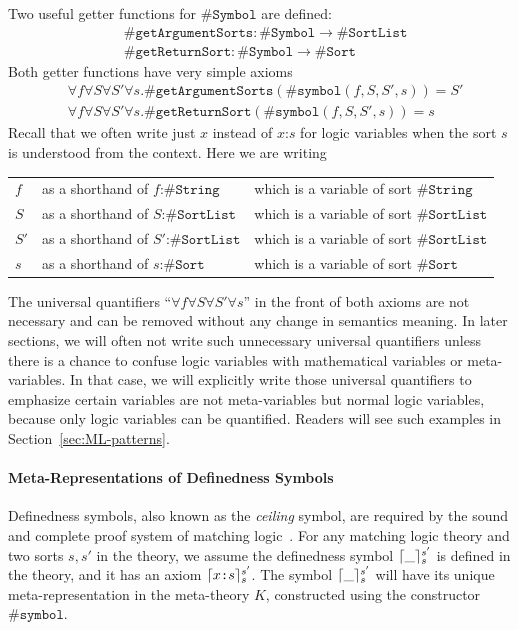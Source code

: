 \documentclass[UTF8,11pt]{article}
\theoremstyle{plain}
\theoremstyle{definition}
\theoremstyle{remark}
\DeclarePairedDelimiter{\ceil}{\lceil}{\rceil}
\newcommand{\cln}{\texttt{:}}
\newcommand{\sharpsymbol}{\#}
\newcommand{\KString}{\texttt{\sharpsymbol String}}
\newcommand{\KSort}{\texttt{\sharpsymbol Sort}}
\newcommand{\KSymbol}{\texttt{\sharpsymbol Symbol}}
\newcommand{\Ksymbol}{\texttt{\sharpsymbol symbol}}
\newcommand{\KgetArgumentSorts}{\texttt{\sharpsymbol getArgumentSorts}}
\newcommand{\KgetReturnSort}{\texttt{\sharpsymbol getReturnSort}}
\newcommand{\KSortList}{\texttt{\sharpsymbol SortList}}
\begin{document}
Two useful getter functions for $\KSymbol$ are defined:
\begin{align*}
 & \KgetArgumentSorts \colon \KSymbol \to \KSortList \\
 & \KgetReturnSort    \colon \KSymbol \to \KSort
\end{align*}
Both getter functions have very simple axioms
\begin{align*}
 & \forall f\forall S \forall S'\forall s . \KgetArgumentSorts(\Ksymbol(f, S, 
 S', s)) = S'\\
 & \forall f\forall S \forall S'\forall s . \KgetReturnSort(\Ksymbol(f, S, S', 
 s)) = s
\end{align*}
Recall that we often write just $x$ instead of $x \cln s$ for logic variables 
when the sort $s$ is understood from the context.
Here we are writing
\begin{center}
\begin{tabular}{lll}
	$f$ & as a shorthand of $f \cln \KString$ & which is a variable of sort 
	$\KString$ \\
	$S$ & as a shorthand of $S \cln \KSortList$ & which is a variable of sort 
	$\KSortList$ \\
	$S'$ & as a shorthand of $S' \cln \KSortList$ & which is a variable of sort 
	$\KSortList$ \\
	$s$ & as a shorthand of $s \cln \KSort$ & which is a variable of sort 
	$\KSort$
\end{tabular}
\end{center}
The universal quantifiers ``$\forall f\forall S \forall S'\forall s$'' in the 
front of both axioms are not necessary and can be removed without any change in 
semantics meaning.
In later sections, we will often not write such unnecessary universal 
quantifiers unless there is a chance to confuse logic variables with 
mathematical variables or meta-variables.
In that case, we will explicitly write those universal quantifiers to emphasize 
certain variables are not meta-variables but normal logic variables, because 
only logic variables can be quantified.
Readers will see such examples in Section~\ref{sec:ML-patterns}.

\paragraph{Meta-Representations of Definedness Symbols}
Definedness symbols, also known as the \emph{ceiling} symbol, are required by 
the sound and complete proof system of matching logic~\cite{rosu-2017-lmcs}.
For any matching logic theory and two sorts $s, s'$ in the theory, we assume 
the definedness symbol $\ceil{\_}_s^{s'}$ is defined in the theory, and it has 
an axiom $\ceil{x \cln s}_s^{s'}$.
The symbol $\ceil{\_}_s^{s'}$ will have its unique meta-representation in the 
meta-theory $K$, constructed using the constructor $\Ksymbol$.
\end{document}
